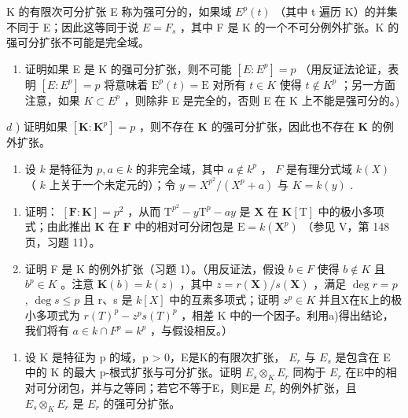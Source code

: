 K 的有限次可分扩张 E 称为强可分的，如果域 \(E^{p}(t)\) （其中 t 遍历 K）的并集不同于 E；因此这等同于说 \(E = F_{s}\) ，其中 F 是 K 的一个不可分例外扩张。K 的强可分扩张不可能是完全域。

\begin{enumerate}
\def\labelenumi{\alph{enumi})}
\setcounter{enumi}{2}
\tightlist
\item
  证明如果 E 是 K 的强可分扩张，则不可能 \([E:E^{p}]=p\) （用反证法论证，表明 \([E:E^{p}]=p\) 将意味着 \(\mathrm{E}^{p}(t)=\mathrm{E}\) 对所有 \(t\in K\) 使得 \(t\notin K^{p}\) ；另一方面注意，如果 \(K\subset E^{p}\) ，则除非 E 是完全的，否则 E 在 K 上不能是强可分的。)
\end{enumerate}

\(d\) ) 证明如果 \([\mathbf{K}:\mathbf{K}^p ] = p\) ，则不存在 \(\mathbf{K}\) 的强可分扩张，因此也不存在 \(\mathbf{K}\) 的例外扩张。

\begin{enumerate}
\def\labelenumi{\arabic{enumi})}
\setcounter{enumi}{1}
\tightlist
\item
  设 \(k\) 是特征为 \(p, a \in k\) 的非完全域，其中 \(a \notin k^p\) ， \(F\) 是有理分式域 \(k(X)\) （ \(k\) 上关于一个未定元的）；令 \(y = X^{p^2} / (X^p + a)\) 与 \(K = k(y)\) .
\end{enumerate}

\begin{enumerate}
\def\labelenumi{\alph{enumi})}
\item
  证明： \([\mathbf{F}:\mathbf{K}] = p^2\) ，从而 \(\mathrm{T}^{p^2} - y\mathrm{T}^p - ay\) 是 \(\mathbf{X}\) 在 \(\mathbf{K}[\mathrm{T}]\) 中的极小多项式；由此推出 \(\mathbf{K}\) 在 \(\mathbf{F}\) 中的相对可分闭包是 \(\mathrm{E} = k(\mathbf{X}^p)\) （参见 V，第 148 页，习题 11）。
\item
  证明 F 是 K 的例外扩张（习题 1）。（用反证法，假设 \(b \in F\) 使得 \(b \notin K\) 且 \(b^{p} \in K\) 。注意 \(\mathbf{K}(b) = k(z)\) ，其中 \(z = r(\mathbf{X}) / s(\mathbf{X})\) ，满足 \(\deg r = p\) , \(\deg s \leqslant p\) 且 r、s 是 \(k[X]\) 中的互素多项式；证明 \(z^{p} \in K\) 并且X在K上的极小多项式为 \(r(T)^{p} - z^{p}s(T)^{p}\) ，相差 K 中的一个因子。利用a)得出结论，我们将有 \(a \in k \cap F^{p} = k^{p}\) ，与假设相反。）
\end{enumerate}

\begin{enumerate}
\def\labelenumi{\arabic{enumi})}
\setcounter{enumi}{2}
\tightlist
\item
  设 K 是特征为 p 的域，p \textgreater{} 0，E是K的有限次扩张， \(E_{r}\) 与 \(E_{s}\) 是包含在 E 中的 K 的最大 p-根式扩张与可分扩张。证明 \(E_{s} \otimes_{K} E_{r}\) 同构于 \(E_{r}\) 在E中的相对可分闭包，并与之等同；若它不等于E，则E是 \(E_{r}\) 的例外扩张，且 \(E_{s} \otimes_{K} E_{r}\) 是 \(E_{r}\) 的强可分扩张。
\end{enumerate}

